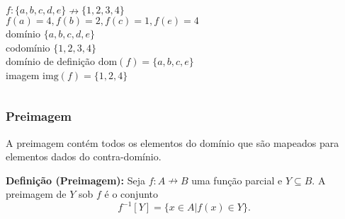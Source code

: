 \begin{frame}
\begin{columns}
    \begin{column}{0.5\textwidth}
      \( f : \{a, b, c, d, e\} \nrightarrow \{1, 2, 3, 4\} \) \\
      \( f(a) = 4, f(b) = 2, f(c) = 1, f(e) = 4 \) \\
      domínio \( \{a, b, c, d, e\} \) \\
      codomínio \( \{1, 2, 3, 4\} \) \\
      domínio de definição \( \text{dom}(f) = \{a, b, c, e\} \) \\
      imagem \( \text{img}(f) = \{1, 2, 4\} \)
    \end{column}
  \end{columns}

\end{frame}
\begin{frame}
  \frametitle{Preimagem}

  A preimagem contém todos os elementos do domínio que são mapeados para elementos dados do contra-domínio.

  \textbf{Definição (Preimagem):}
  Seja \( f : A \nrightarrow B \) uma função parcial e \( Y \subseteq B \).
  A preimagem de \( Y \) sob \( f \) é o conjunto
  \[
  f^{-1}[Y] = \{x \in A | f(x) \in Y\}.
  \]

      \centering
    

\end{frame}

